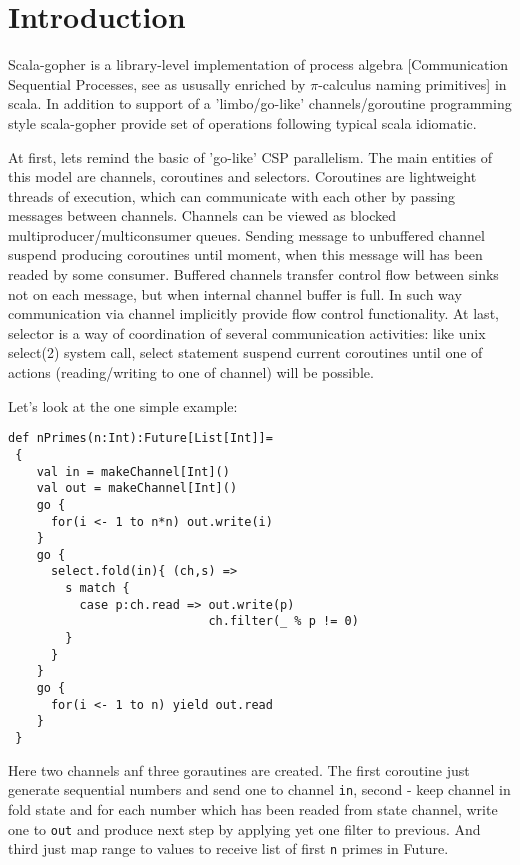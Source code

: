 \documentclass[12pt]{article}
\begin{document}
\maketitle


\section{Introduction}

 Scala-gopher is a library-level implementation of process algebra [Communication Sequential Processes, see \cite{Hoare85communicatingsequential} as ususally enriched by $\pi$-calculus \cite{Milner:1992:CMP:162037.162038} naming primitives] in scala. In addition to support of a 'limbo/go-like' \cite{Inferno:Limbo}  \cite{golang} channels/goroutine programming style scala-gopher provide set of operations following typical scala idiomatic. 

    At first, lets remind the basic of 'go-like' CSP parallelism. The main entities of this model are channels, coroutines and selectors. Coroutines are lightweight threads of execution, which can communicate with each other by passing messages between channels. Channels can be viewed as blocked multiproducer/multiconsumer queues. Sending message to unbuffered channel suspend producing coroutines until moment, when this message will has been readed by some consumer. Buffered channels transfer control flow between sinks not on each message, but when internal channel buffer is full.  In such way communication via channel implicitly provide flow control functionality.  At last, selector is a way of coordination of several communication activities: like unix select(2) system call, select statement suspend current coroutines until one of actions (reading/writing to one of channel) will be possible.

   Let's look at the one simple example:
\begin{Verbatim}[fontsize=\small]
 def nPrimes(n:Int):Future[List[Int]]=
 {
    val in = makeChannel[Int]()
    val out = makeChannel[Int]()
    go {
      for(i <- 1 to n*n) out.write(i)
    }
    go {
      select.fold(in){ (ch,s) =>
        s match {
          case p:ch.read => out.write(p)
                            ch.filter(_ % p != 0)
        }
      }
    }
    go {
      for(i <- 1 to n) yield out.read
    }
 }
\end{Verbatim}
  Here two channels anf three gorautines are created.  The first coroutine just generate sequential numbers and send one to channel \verb|in|, second - keep channel in fold state and for each number which has been readed from state channel, write one to \verb|out| and produce next step by applying yet one filter to previous. And third just map range to values to receive list of first \verb|n| primes in Future.
\end{document}
